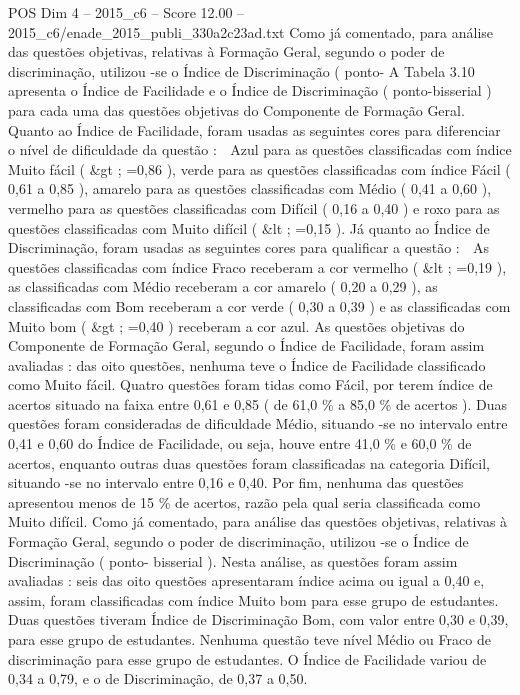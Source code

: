 \begin{textsample}{POS Dim 4 – 2015\_c6 – Score 12.00 – 2015\_c6/enade\_2015\_publi\_330a2c23ad.txt}
Como já comentado, para análise das questões objetivas, relativas à Formação Geral, segundo o poder de discriminação, utilizou -se o Índice de Discriminação ( ponto- A Tabela 3.10 apresenta o Índice de Facilidade e o Índice de Discriminação ( ponto-bisserial ) para cada uma das questões objetivas do Componente de Formação Geral.
Quanto ao Índice de Facilidade, foram usadas as seguintes cores para diferenciar o nível de dificuldade da questão :  Azul para as questões classificadas com índice Muito fácil ( \&gt ; =0,86 ), verde para as questões classificadas com índice Fácil ( 0,61 a 0,85 ), amarelo para as questões classificadas com Médio ( 0,41 a 0,60 ), vermelho para as questões classificadas com Difícil ( 0,16 a 0,40 ) e roxo para as questões classificadas com Muito difícil ( \&lt ; =0,15 ).
Já quanto ao Índice de Discriminação, foram usadas as seguintes cores para qualificar a questão :  As questões classificadas com índice Fraco receberam a cor vermelho ( \&lt ; =0,19 ), as classificadas com Médio receberam a cor amarelo ( 0,20 a 0,29 ), as classificadas com Bom receberam a cor verde ( 0,30 a 0,39 ) e as classificadas com Muito bom ( \&gt ; =0,40 ) receberam a cor azul.
As questões objetivas do Componente de Formação Geral, segundo o Índice de Facilidade, foram assim avaliadas : das oito questões, nenhuma teve o Índice de Facilidade classificado como Muito fácil.
Quatro questões foram tidas como Fácil, por terem índice de acertos situado na faixa entre 0,61 e 0,85 ( de 61,0 \% a 85,0 \% de acertos ).
Duas questões foram consideradas de dificuldade Médio, situando -se no intervalo entre 0,41 e 0,60 do Índice de Facilidade, ou seja, houve entre 41,0 \% e 60,0 \% de acertos, enquanto outras duas questões foram classificadas na categoria Difícil, situando -se no intervalo entre 0,16 e 0,40.
Por fim, nenhuma das questões apresentou menos de 15 \% de acertos, razão pela qual seria classificada como Muito difícil.
Como já comentado, para análise das questões objetivas, relativas à Formação Geral, segundo o poder de discriminação, utilizou -se o Índice de Discriminação ( ponto- bisserial ).
Nesta análise, as questões foram assim avaliadas : seis das oito questões apresentaram índice acima ou igual a 0,40 e, assim, foram classificadas com índice Muito bom para esse grupo de estudantes.
Duas questões tiveram Índice de Discriminação Bom, com valor entre 0,30 e 0,39, para esse grupo de estudantes.
Nenhuma questão teve nível Médio ou Fraco de discriminação para esse grupo de estudantes.
O Índice de Facilidade variou de 0,34 a 0,79, e o de Discriminação, de 0,37 a 0,50.

\end{textsample}

